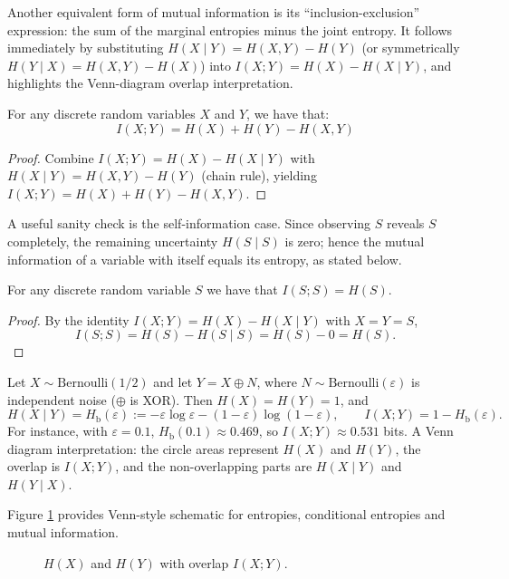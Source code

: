 Another equivalent form of mutual information is its “inclusion-exclusion” expression: the sum of the marginal entropies minus the joint entropy. It follows immediately by substituting $H(X\mid Y)=H(X,Y)-H(Y)$ (or symmetrically $H(Y\mid X)=H(X,Y)-H(X)$) into $I(X;Y)=H(X)-H(X\mid Y)$, and highlights the Venn-diagram overlap interpretation.

\begin{proposition}
For any discrete random variables $X$ and $Y$, we have that:
\[
I(X;Y) = H(X) + H(Y) - H(X, Y)
\]
\end{proposition}
\begin{proof}
Combine $I(X;Y)=H(X)-H(X\mid Y)$ with $H(X\mid Y)=H(X,Y)-H(Y)$ (chain rule), yielding
$I(X;Y)=H(X)+H(Y)-H(X,Y)$.
\end{proof}

A useful sanity check is the self-information case. Since observing $S$ reveals $S$ completely, the remaining uncertainty $H(S\mid S)$ is zero; hence the mutual information of a variable with itself equals its entropy, as stated below.

\begin{proposition}
For any discrete random variable $S$ we have that $I(S;S)=H(S)$.
\end{proposition}
\begin{proof}
By the identity $I(X;Y)=H(X)-H(X\mid Y)$ with $X=Y=S$,
\[
I(S;S)=H(S)-H(S\mid S)=H(S)-0=H(S).
\]
\end{proof}

\begin{example}
Let $X\sim\mathrm{Bernoulli}(1/2)$ and let $Y=X\oplus N$, where $N\sim\mathrm{Bernoulli}(\varepsilon)$ is independent noise ($\oplus$ is XOR). Then $H(X)=H(Y)=1$, and
\[
H(X\mid Y)=H_\mathrm{b}(\varepsilon):=-\varepsilon\log\varepsilon-(1-\varepsilon)\log(1-\varepsilon),\qquad
I(X;Y)=1-H_\mathrm{b}(\varepsilon).
\]
For instance, with $\varepsilon=0.1$, $H_\mathrm{b}(0.1)\approx 0.469$, so $I(X;Y)\approx 0.531$ bits. A Venn diagram interpretation: the circle areas represent $H(X)$ and $H(Y)$, the overlap is $I(X;Y)$, and the non-overlapping parts are $H(X\mid Y)$ and $H(Y\mid X)$.
\end{example}

Figure \ref{fig:venn-entropy} provides Venn-style schematic for entropies, conditional entropies and mutual information.

\begin{figure}[h]
\label{fig:venn-entropy}
\centering
{}
\caption{$H(X)$ and $H(Y)$ with overlap $I(X;Y)$.}
\end{figure}

